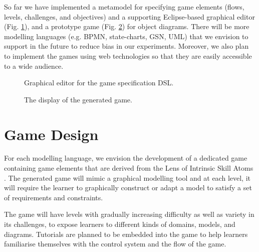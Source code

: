 \documentclass[runningheads,a4paper]{llncs}
\begin{document}
So far we have implemented a metamodel for specifying game elements (flows, levels, challenges, and objectives) and a supporting Eclipse-based graphical editor (Fig. \ref{fig:002}), and a prototype game (Fig. \ref{fig:001}) for object diagrams. There will be more modelling languages (e.g. BPMN, state-charts, GSN, UML) that we envision to support in the future to reduce bias in our experiments. Moreover, we also plan to implement the games using web technologies so that they are easily accessible to a wide audience.

\begin{figure}[H]
\centering
{}
\caption{Graphical editor for the game specification DSL.}
\label{fig:002}
\end{figure}

\begin{figure}[H]
\centering
{}
\caption{The display of the generated game.}
\label{fig:001}
\end{figure}

\section{Game Design}
For each modelling language, we envision the development of a dedicated game containing game elements that are derived from the Lens of Intrinsic Skill Atoms \cite{deterding2015lens}. The generated game will mimic a graphical modelling tool and at each level, it will require the learner to graphically construct or adapt a model to satisfy a set of requirements and constraints.
	
The game will have levels with gradually increasing difficulty as well as variety in its challenges, to expose learners to different kinds of domains, models, and diagrams. Tutorials are planned to be embedded into the game to help learners familiarise themselves with the control system and the flow of the game. 
\end{document}
